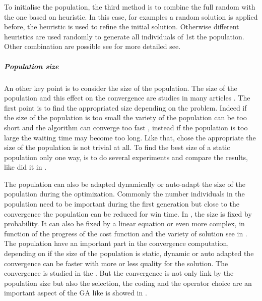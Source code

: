 To initialise the population, the third method is to combine the full random with the one based on heuristic. 
In this case, for examples a random solution is applied before, the heuristic is used to refine the initial solution. Otherwise different heuristics are used randomly to generate all individuals of  1st the population. Other combination are possible  see \cite{113*mais2010} for more detailed see.

\subparagraph{Population size}
An other key point is to consider the size  of the population. The size of the population and this effect on the convergence are studies in many articles \cite{64*matsui1999,70*arabas1994,71*grefenstette1986,77*shi2005,97*goldberg1985,109*cerf1995}. 
The first point is to find the appropriated size depending on the problem. Indeed if the size of the population is too small the variety of the population can be too short and the algorithm can converge too fast \cite{70*arabas1994}, instead if the population is too large the waiting time may become too long.  
Like that, chose the appropriate the size of the population is not trivial at all. To find the best size of a static population only one way, is to do several experiments and compare the results, like did it in \cite{71*grefenstette1986}.

 The population can also be adapted dynamically or auto-adapt the size of the population during the optimization. Commonly the number individuals in the population need to be important during the first generation but close to the convergence the population can be reduced for win time.
  In \cite{133*schwefel1984}, the size is fixed by probability. It can also be fixed by a linear equation or even more complex, in function of the progress of the cost function and the variety of solution see in \cite{70*arabas1994}. The population have an important part in the convergence computation, depending on if the size of the population is static, dynamic or auto adapted the convergence can be faster with more or less quality for the solution. The convergence is studied in the \cite{109*cerf1995}. But the convergence is not only link by the population size but also the selection, the coding and the operator choice are an important aspect of the GA like is showed in \cite{71*grefenstette1986,77*shi2005}.  



